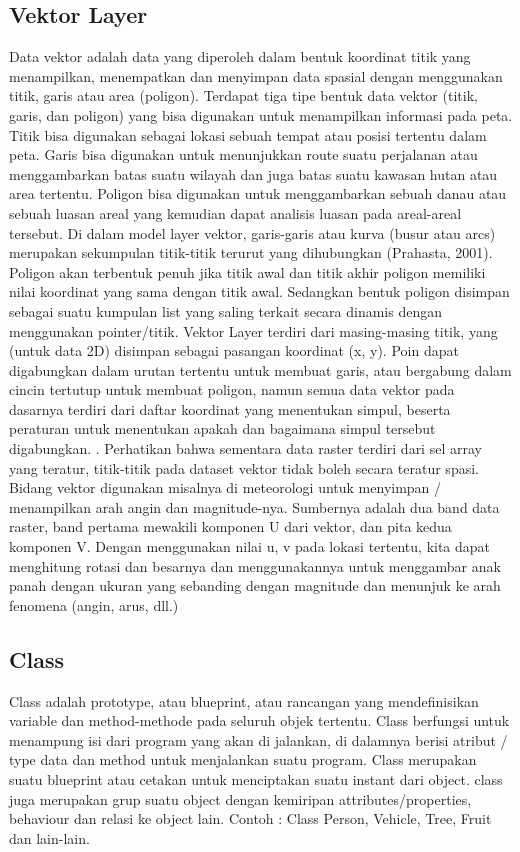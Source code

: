 \subsection{Vektor Layer}
Data vektor adalah data yang diperoleh dalam bentuk koordinat titik yang menampilkan, 
menempatkan dan menyimpan data spasial dengan menggunakan titik, garis atau area (poligon). 
Terdapat tiga tipe bentuk data vektor (titik, garis, dan poligon) yang bisa digunakan untuk menampilkan informasi pada peta. 
Titik bisa digunakan sebagai lokasi sebuah tempat atau posisi tertentu dalam peta. 
Garis bisa digunakan untuk menunjukkan route suatu perjalanan atau menggambarkan batas suatu wilayah 
dan juga batas suatu kawasan hutan atau area tertentu. 
Poligon bisa digunakan untuk menggambarkan sebuah danau atau sebuah luasan areal yang kemudian dapat analisis luasan 
pada areal-areal tersebut.
Di dalam model layer vektor, garis-garis atau kurva (busur atau arcs) merupakan sekumpulan titik-titik terurut yang dihubungkan (Prahasta, 2001). Poligon akan terbentuk penuh jika titik awal dan titik akhir poligon memiliki nilai koordinat yang sama dengan titik awal. Sedangkan bentuk poligon disimpan sebagai suatu kumpulan list yang saling terkait secara dinamis dengan menggunakan pointer/titik.
Vektor Layer terdiri dari masing-masing titik, yang (untuk data 2D) disimpan sebagai pasangan koordinat (x, y). 
Poin dapat digabungkan dalam urutan tertentu untuk membuat garis, atau bergabung dalam cincin tertutup untuk 
membuat poligon, namun semua data vektor pada dasarnya terdiri dari daftar koordinat yang menentukan simpul, 
beserta peraturan untuk menentukan apakah dan bagaimana simpul tersebut digabungkan. .
Perhatikan bahwa sementara data raster terdiri dari sel array yang teratur, 
titik-titik pada dataset vektor tidak boleh secara teratur spasi.
Bidang vektor digunakan misalnya di meteorologi untuk menyimpan / menampilkan arah angin dan magnitude-nya.
Sumbernya adalah dua band data raster, band pertama mewakili komponen U dari vektor, dan pita kedua komponen V. Dengan menggunakan nilai u, v pada lokasi tertentu, kita dapat menghitung rotasi dan besarnya dan menggunakannya untuk menggambar anak panah dengan ukuran yang sebanding dengan magnitude dan menunjuk ke arah fenomena (angin, arus, dll.)


\subsection{Class}
Class adalah prototype, atau blueprint, atau rancangan yang mendefinisikan variable dan method-methode pada seluruh objek tertentu. 
Class berfungsi untuk menampung isi dari program yang akan di jalankan, di dalamnya berisi atribut / type data dan method untuk menjalankan suatu program.
Class merupakan suatu blueprint atau cetakan untuk menciptakan suatu instant dari  object. 
class juga merupakan grup suatu object dengan kemiripan attributes/properties, behaviour dan relasi ke object lain. 
Contoh : Class Person, Vehicle, Tree, Fruit dan lain-lain.

